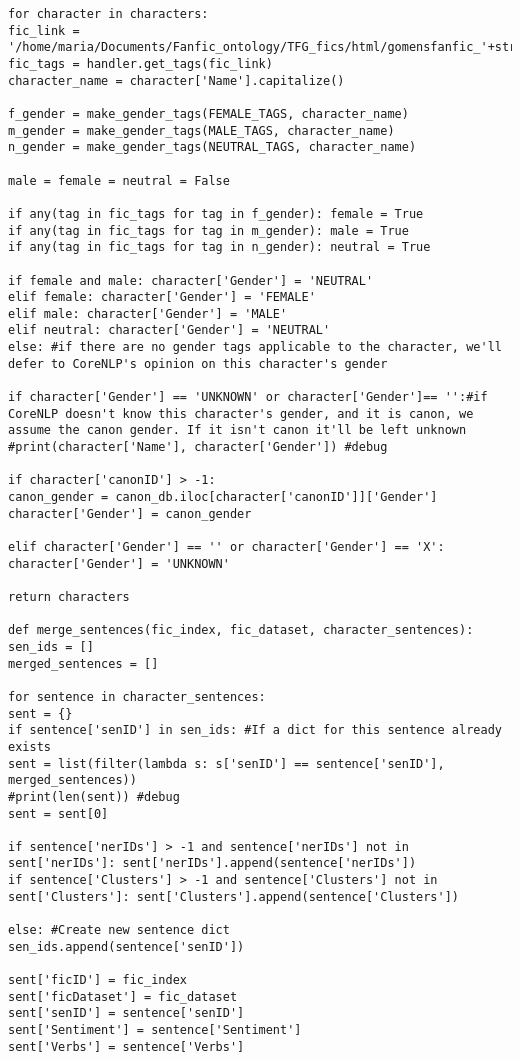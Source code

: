 \documentclass{pre-tfg}
\begin{document}
\begin{lstlisting}[style=consola]
for character in characters:
fic_link = '/home/maria/Documents/Fanfic_ontology/TFG_fics/html/gomensfanfic_'+str(character['ficID'])+'.html'
fic_tags = handler.get_tags(fic_link)
character_name = character['Name'].capitalize()

f_gender = make_gender_tags(FEMALE_TAGS, character_name)
m_gender = make_gender_tags(MALE_TAGS, character_name)
n_gender = make_gender_tags(NEUTRAL_TAGS, character_name)

male = female = neutral = False

if any(tag in fic_tags for tag in f_gender): female = True
if any(tag in fic_tags for tag in m_gender): male = True
if any(tag in fic_tags for tag in n_gender): neutral = True

if female and male: character['Gender'] = 'NEUTRAL'
elif female: character['Gender'] = 'FEMALE'
elif male: character['Gender'] = 'MALE'
elif neutral: character['Gender'] = 'NEUTRAL'
else: #if there are no gender tags applicable to the character, we'll defer to CoreNLP's opinion on this character's gender

if character['Gender'] == 'UNKNOWN' or character['Gender']== '':#if CoreNLP doesn't know this character's gender, and it is canon, we assume the canon gender. If it isn't canon it'll be left unknown
#print(character['Name'], character['Gender']) #debug

if character['canonID'] > -1:
canon_gender = canon_db.iloc[character['canonID']]['Gender']
character['Gender'] = canon_gender

elif character['Gender'] == '' or character['Gender'] == 'X': character['Gender'] = 'UNKNOWN' 

return characters

def merge_sentences(fic_index, fic_dataset, character_sentences):
sen_ids = []
merged_sentences = []

for sentence in character_sentences:
sent = {}
if sentence['senID'] in sen_ids: #If a dict for this sentence already exists
sent = list(filter(lambda s: s['senID'] == sentence['senID'], merged_sentences))
#print(len(sent)) #debug
sent = sent[0]

if sentence['nerIDs'] > -1 and sentence['nerIDs'] not in sent['nerIDs']: sent['nerIDs'].append(sentence['nerIDs'])
if sentence['Clusters'] > -1 and sentence['Clusters'] not in sent['Clusters']: sent['Clusters'].append(sentence['Clusters'])

else: #Create new sentence dict
sen_ids.append(sentence['senID'])

sent['ficID'] = fic_index
sent['ficDataset'] = fic_dataset
sent['senID'] = sentence['senID']
sent['Sentiment'] = sentence['Sentiment']
sent['Verbs'] = sentence['Verbs']


\end{lstlisting}
\end{document}
